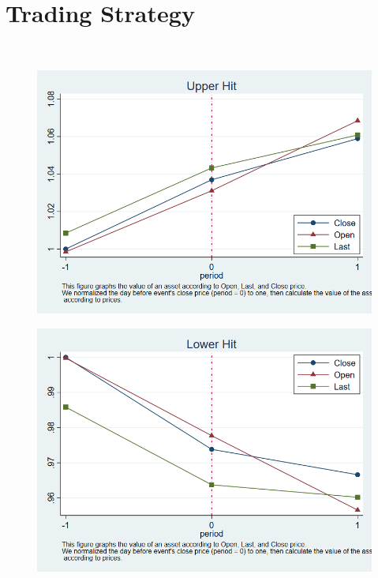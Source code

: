 \documentclass[12pt]{article}
\begin{document}
\FloatBarrier

\begin{table}[htbp]
\centering

{}
\end{table}

\FloatBarrier

\linespread{0.5}
\section{Trading Strategy}
‌ %
‌ %

\begin{figure}[htbp]
\centering
\includegraphics[width=0.6\linewidth]{DUT}
\caption{}
\label{fig:dut}
\end{figure}
\begin{figure}[htbp]
\centering
\includegraphics[width=0.65\linewidth]{DLT}
\caption{}
\label{fig:dlt}
\end{figure}
\end{document}
